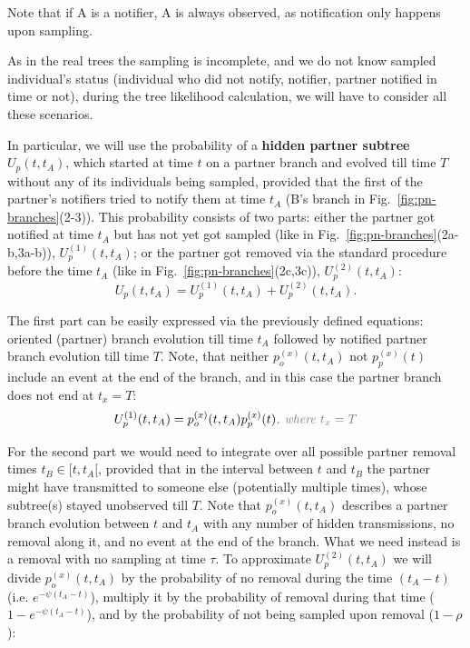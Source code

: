 \documentclass[a4paper,10pt]{article}
\begin{document}
Note that if A is a notifier, A is always observed, as notification only happens upon sampling.

As in the real trees the sampling is incomplete, and we do not know sampled individual's status (individual who did not notify, notifier, partner notified in time or not), during the tree likelihood calculation, we will have to consider all these scenarios.

In particular, we will use the probability of a \textbf{hidden partner subtree} $U_p(t, t_A)$, which started at time $t$ on a partner branch and evolved till time $T$ without any of its individuals being sampled, provided that the first of the partner's notifiers tried to notify them at time $t_A$ (B's branch in Fig.~\ref{fig:pn-branches}(2-3)). This probability consists of two parts: either the partner got notified at time $t_A$ but has not yet got sampled (like in Fig.~\ref{fig:pn-branches}(2a-b,3a-b)), $U_p^{(1)}(t, t_A)$;  or the partner got removed via the standard procedure before the time $t_A$ (like in Fig.~\ref{fig:pn-branches}(2c,3c)), $U_p^{(2)}(t, t_A)$: 
\begin{equation}
U_p(t, t_A) = U_p^{(1)}(t, t_A) + U_p^{(2)}(t, t_A).
\end{equation} 

The first part can be easily expressed via the previously defined equations: oriented (partner) branch evolution till time $t_A$ followed by notified partner branch evolution till time $T$. Note, that neither  $p_o^{(x)}(t, t_A)$ not $p_p^{(x)}(t)$ include an event at the end of the branch, and in this case the partner branch does not end at $t_x = T$:
\begin{equation}
U_p^{(1)}(t, t_A) = p_o^{(x)}(t, t_A) p_p^{(x)}(t)\textit{\color{gray}, where $t_x =T$}
\end{equation} 

For the second part we would need to integrate over all possible partner removal times $t_B \in [t, t_A[$, provided that in the interval between $t$ and $t_B$ the partner might have transmitted to someone else (potentially multiple times), whose subtree(s) stayed unobserved till $T$. Note that $p_o^{(x)}(t, t_A)$ describes a partner branch evolution between $t$ and $t_A$ with any number of hidden transmissions, no removal along it, and no event at the end of the branch. What we need instead is a removal with no sampling at time $\tau$. To approximate $U_p^{(2)}(t, t_A)$ we will divide $p_o^{(x)}(t, t_A)$ by the probability of no removal during the time $(t_A - t)$ (i.e. $e^{-\psi(t_A - t)}$), multiply it by the probability of removal during that time ($1 - e^{-\psi(t_A - t)}$), and by the probability of not being sampled upon removal ($1 - \rho$):
\end{document}
